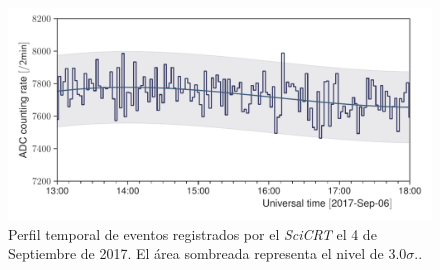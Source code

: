 \begin{figure}
        \centering
        \includegraphics[width=\textwidth]{neutron-170906.pdf}
        \caption{Perfil temporal de eventos registrados por el \emph{SciCRT} el \num{4} de Septiembre de \num{2017}. El área sombreada representa el nivel de $3.0\sigma$..}
        \label{fig:september-06}
\end{figure}
